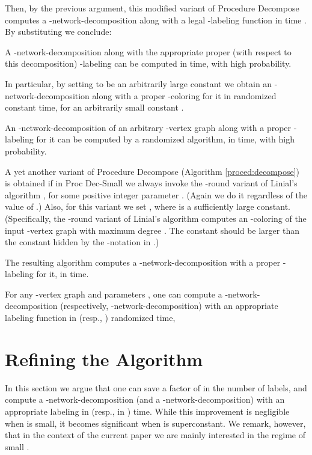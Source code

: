 \documentclass[11pt]{article}
\begin{document}
Then, by the previous argument, this modified variant of Procedure Decompose computes a -network-decomposition along with a legal -labeling function in time . By substituting  we conclude:
\begin{thm} A -network-decomposition along with the appropriate proper (with respect to this decomposition) -labeling can be computed in  time, with high probability.
\end{thm}
 
In particular, by setting  to be an arbitrarily large constant we obtain an -network-decomposition along with a proper -coloring for it in randomized constant time, for an arbitrarily small constant .
\begin{col}
An -network-decomposition of an arbitrary -vertex graph along with a proper -labeling for it can be computed by a randomized algorithm, in  time, with high probability.
\end{col}
A yet another variant of Procedure Decompose (Algorithm \ref{proced:decompose}) is obtained if in Proc Dec-Small we always invoke the -round variant of Linial's algorithm \cite{L92}, for some positive integer parameter . (Again we do it regardless of the value of .) Also, for this variant we set , where  is a sufficiently large constant. (Specifically, the -round variant of Linial's algorithm computes an -coloring of the input -vertex graph with maximum degree . The constant  should be larger than the constant hidden by the -notation in .)

The resulting algorithm computes a -network-decomposition with a proper -labeling for it, in  time.
\begin{col}
For any -vertex graph  and parameters , one can compute a -network-decomposition (respectively, -network-decomposition) with an appropriate labeling function in  (resp., ) randomized time, 
\end{col}





\section{Refining the Algorithm} \label{sc:refine}
In this section we argue that one can save a factor of  in the number of labels, and compute a -network-decomposition (and a -network-decomposition) with an appropriate labeling in  (resp., in ) time. While this improvement is negligible when  is small, it becomes significant when  is superconstant. We remark, however, that in the context of the current paper we are mainly interested in the regime of small .
\end{document}
